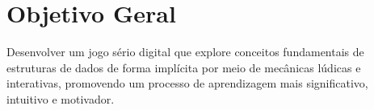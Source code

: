 \section{Objetivo Geral}

Desenvolver um jogo sério digital que explore conceitos fundamentais de estruturas de dados de forma implícita por meio de mecânicas lúdicas e interativas, promovendo um processo de aprendizagem mais significativo, intuitivo e motivador.
